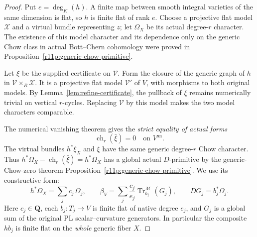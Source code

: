 \documentclass[11pt]{article}
\theoremstyle{definition}
\theoremstyle{remark}
\numberwithin{equation}{section}
\newcommand{\an}{\mathrm{an}}
\newcommand{\Tr}{\operatorname{Tr}}
\begin{document}
\begin{proof}
Put $e=\deg_K(h)$.  A finite map between smooth integral varieties
of the same dimension is flat, so $h$ is finite flat of rank $e$.
Choose a projective flat model $\mathcal X$ and a virtual bundle
representing $z$; let $\Omega_X$ be its actual degree-$r$ character.
The existence of this model character and its dependence only on
the generic Chow class in actual Bott--Chern cohomology were proved
in Proposition~\ref{r11p:generic-chow-primitive}.

Let $\xi$ be the supplied certificate on $\mathcal V$.  Form the
closure of the generic graph of $h$ in
$\mathcal V\times_R\mathcal X$.  It is a projective flat model
$\mathcal V'$ of $V$, with morphisms to both original models.
By Lemma~\ref{lem:refine-certificate}, the pullback of $\xi$ remains
numerically trivial on vertical $r$-cycles.  Replacing
$\mathcal V$ by this model makes the two model characters
comparable.

The numerical vanishing theorem 
gives the \emph{strict equality of actual forms}
\[
                     \operatorname{ch}_r(\bar\xi)=0
                                \quad\text{on }V^{\an}.
\]
The virtual bundles $h^*\xi_X$ and $\xi$ have the same generic
degree-$r$ Chow character.  Thus
$h^*\Omega_X-\operatorname{ch}_r(\bar\xi)=h^*\Omega_X$
has a global actual $D$-primitive by the generic-Chow-zero theorem
Proposition~\ref{r11p:generic-chow-primitive}.  We use its constructive form:
\begin{equation}\label{eq:certificate-primitive}
 h^*\Omega_X=\sum_jc_j\,\Omega_j,
 \qquad
 \beta_V=\sum_j\frac{c_j}{e_j}
        \Tr^{\mathscr M}_{b_j}(G_j),
 \qquad
 DG_j=b_j^*\Omega_j.
\end{equation}
Here $c_j\in\mathbf Q$, each $b_j:T_j\to V$ is finite flat of
native degree $e_j$, and $G_j$ is a global sum of the original
PL scalar--curvature generators.  In particular the composite
$h b_j$ is finite flat on the \emph{whole} generic fiber $X$.


\end{proof}
\end{document}
